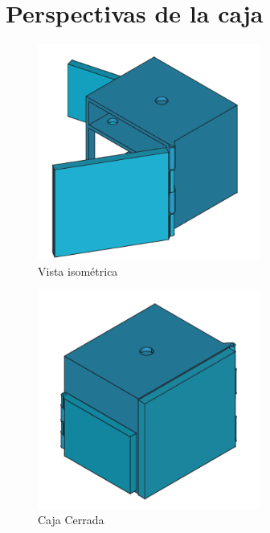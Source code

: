 \section{Perspectivas de la caja}\label{sec:anexo_caja}

\begin{figure}[H]
	\centering
	\includegraphics[width=0.65\textwidth]{images/4-DesarrolloTeorico/4-1-caja/CAJA_3D_ISOMETRICA_2.png}
	\caption{Vista isométrica}
\end{figure}

\begin{figure}[H]
	\centering
	\includegraphics[width=0.65\textwidth]{images/4-DesarrolloTeorico/4-1-caja/CAJA_3D_CERRADA.png}
	\caption{Caja Cerrada}
\end{figure}


